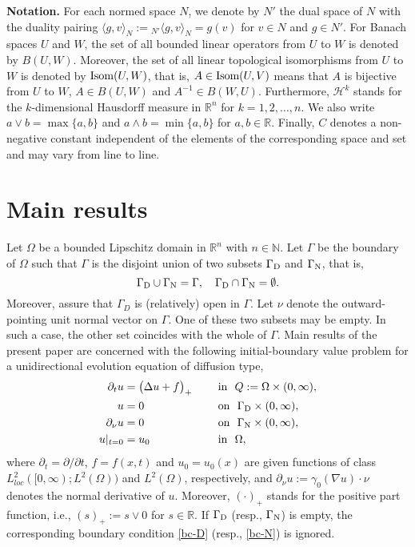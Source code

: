 \documentclass[reqno,10pt]{amsart}
\begin{document}
\bigskip

\noindent
{\bf Notation.}
For each normed space $N$, we denote by $N'$ the dual space of $N$
with the duality pairing $\langle g,v\rangle_N := {}_{N'}\langle
g,v\rangle_N = g(v)$ for $v\in N$ and $g\in N'$.
For Banach spaces $U$ and $W$, the set of all bounded linear operators from $U$
to $W$ is denoted by $B(U,W)$. Moreover, the set of all linear topological
isomorphisms from $U$ to $W$ is denoted by ${\mbox{\rm Isom}} (U,W)$, that is, $A\in
{\mbox{\rm Isom}} (U,V)$ means that $A$ is bijective from $U$ to $W$, $A\in B(U,W)$
and $A^{-1}\in B(W,U)$. Furthermore, ${{\mathcal H}}^k$ stands for the
$k$-dimensional Hausdorff measure in $\mathbb R^n$ for $k =
1,2,\ldots,n$. We also write $a \vee b = \max\{a,b\}$ and $a \wedge b =
\min\{a,b\}$ for $a,b \in \mathbb R$. Finally, $C$ denotes
a non-negative constant independent of the elements of the corresponding
space and set and may vary from line to line.

\section{Main results}
\label{sec-mr} 

Let $\Omega$ be a bounded Lipschitz domain in ${{\mathbb R}}^n$ with $n\in{{\mathbb N}}$.
Let $\Gamma$ be the boundary of $\Omega$ such that $\Gamma$ is the
disjoint union of two subsets ${{\Gamma_{\rm\scriptsize D}}}$ and ${{\Gamma_{\rm\scriptsize N}}}$, that is,
$$
{{\Gamma_{\rm\scriptsize D}}} \cup {{\Gamma_{\rm\scriptsize N}}} = \Gamma, \quad {{\Gamma_{\rm\scriptsize D}}} \cap {{\Gamma_{\rm\scriptsize N}}} = \emptyset.
$$
Moreover, assure that $\Gamma_D$ is (relatively) open in $\Gamma$. Let
$\nu$ denote the outward-pointing unit normal vector on $\Gamma$.
One of these two subsets may be empty. In such a case, the other set
coincides with the whole of $\Gamma$.
Main results of the present paper are concerned with the following
initial-boundary value problem for a unidirectional evolution equation
of diffusion type,
\begin{alignat}{4}
\partial_t u &=\big( \Delta u + f \big)_+\quad
&&\mbox{ in } \ Q := \Omega \times (0,\infty), \label{is1}\\
u&=0
&&\mbox{ on } \ {{\Gamma_{\rm\scriptsize D}}} \times (0,\infty),\label{bc-D}\\
\partial_\nu u &=0
&&\mbox{ on } \ {{\Gamma_{\rm\scriptsize N}}} \times (0,\infty),\label{bc-N}\\
u|_{t = 0}&=u_0
&&\mbox{ in } \ \Omega,\label{ic}
\end{alignat}
where $\partial_t = \partial/\partial t$, $f = f(x,t)$ and $u_0 = u_0(x)$ are
given functions of class $L^2_{loc}([0,\infty);L^2(\Omega))$ and
$L^2(\Omega)$, respectively, and $\partial_\nu u := \gamma_0(\nabla u)
\cdot \nu$ denotes the normal
derivative of $u$. Moreover, $(\cdot)_+$ stands for the positive part
function, i.e., $(s)_+ := s \vee 0$ for $s \in {{\mathbb R}}$. If ${{\Gamma_{\rm\scriptsize D}}}$ (resp.,
${{\Gamma_{\rm\scriptsize N}}}$) is empty, the corresponding boundary condition \eqref{bc-D}
(resp., \eqref{bc-N}) is ignored.
\end{document}
